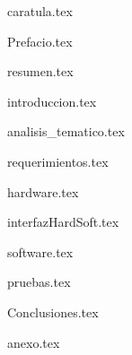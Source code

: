 \documentclass[a4paper,openany,12pt]{book}
\renewcommand{\headrulewidth}{0pt}%
\renewcommand{\headrulewidth}{0pt}
\renewcommand{\footrulewidth}{0pt}}
\begin{document}
{caratula.tex}

\afterpage{\null\newpage}
\newpage

\frontmatter

\tableofcontents
\listoftables
\listoffigures


\pagestyle{plain}
{Prefacio.tex}

{resumen.tex}
\afterpage{\null\newpage}
\newpage


\pagestyle{fancy}
\setlength{\headheight}{15pt}%

\lhead[]{}
\chead[]{}
\rhead[]{}
\cfoot[]{}
\fancyhead[LO,RE]{ \leftmark}%
\renewcommand{\headrulewidth}{0pt}%
\fancyfoot[LO,RE]{\thepage}%

\fancypagestyle{plain}{%
\fancyhf{} 
\fancyfoot[LO,RE]{\thepage}
\renewcommand{\headrulewidth}{0pt}
\renewcommand{\footrulewidth}{0pt}}


\mainmatter

{introduccion.tex}

{analisis_tematico.tex}

{requerimientos.tex}

{hardware.tex}

{interfazHardSoft.tex}

{software.tex}

{pruebas.tex}

{Conclusiones.tex}


{anexo.tex}




\nocite{*}


\end{document}
